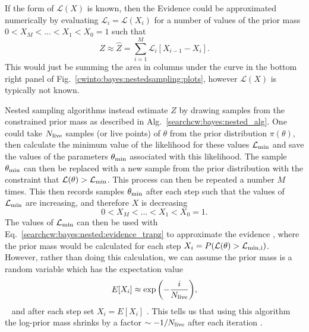 If the form of $\mathcal{L}(X)$ is known, then the Evidence could be approximated numerically by evaluating $\mathcal{L}_i = \mathcal{L}(X_i)$ for a number of values of the prior mass $0 < X_M < ... < X_1 < X_0 = 1$ such that
\begin{equation}
\label{searchcw:bayes:nested:evidence_trapz}
Z \approx \hat{Z} = \sum_{i=1}^{M} \mathcal{L}_i \left[  X_{i-1} - X_{i}\right].
\end{equation} 
This would just be summing the area in columns under the curve in the bottom right panel of Fig.~\ref{cwinto:bayes:nestedsampling:plots}, however $\mathcal{L}(X)$  is typically not known.

Nested sampling algorithms instead estimate $Z$ by drawing samples from the constrained prior mass as described in Alg.~\ref{searchcw:bayes:nested_alg}.
One could take $N_{\rm{live}}$ samples (or live points) of $\theta$ from the prior distribution $\pi(\theta)$, then calculate the minimum value of the likelihood for these values $\mathcal{L}_{\rm{min}}$ and save the values of the parameters $\theta_{\rm{min}}$ associated with this likelihood.
The sample $\theta_{\rm{min}}$ can then be replaced with a new sample from the prior distribution with the constraint that $\mathcal{L}(\theta) > \mathcal{L}_{\rm{min}}$. This process can then be repeated a number $M$ times.
This then records samples $\theta_{\rm{min}}$ after each step such that the values of $\mathcal{L}_{\rm{min}}$ are increasing, and therefore $X$ is decreasing
\begin{equation}
	0 < X_M < ... < X_1 < X_0 = 1.
\end{equation}
The values of $\mathcal{L}_{\rm{min}}$ can then be used with Eq.~\ref{searchcw:bayes:nested:evidence_trapz} to approximate the evidence , where the prior mass would be calculated for each step $X_i = P(\mathcal{L}(\theta) > \mathcal{L}_{\rm{min},i})$.
However, rather than doing this calculation, we can assume the prior mass is a random variable which has the expectation value
\begin{equation}
E[X_i] \approx \exp{\left(-\frac{i}{N_{\rm{live}}}\right)},
\end{equation}
%
~
and after each step set $X_i = E[X_i]$ \citep{feroz2019ImportanceNested}.
This tells us that using this algorithm the log-prior mass shrinks by a factor $\sim -1/N_{\rm{live}}$ after each iteration \citep{speagle2019DynestyDynamic}. 

